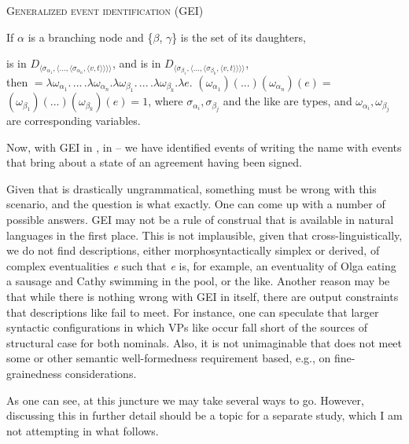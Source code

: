 \documentclass[output=paper,colorlinks,citecolor=brown]{langscibook}
\begin{document}
\ea   \textsc{Generalized event identification} (GEI)\label{ex:tatevosov:94}

If $\alpha$ is a branching node and \{$\beta$, $\gamma$\} is the set of its daughters,

\sib{$\beta$} is in $D_{\langle\sigma_{\alpha_{1}}, \langle..., \langle \sigma_{\alpha_{n}}, \langle v,t\rangle\rangle\rangle\rangle}$, and \sib{$\gamma$} is in $D_{\langle\sigma_{\beta_{1}}, \langle ..., \langle \sigma_{\beta_{k}}, \langle v,t\rangle\rangle\rangle\rangle}$, \\
then \sib{$\alpha$} $= \lambda \omega_{\alpha_{1}}.\, ...\, . \lambda \omega_{\alpha_{n}}. \lambda \omega_{\beta_{1}}.\, ...\, . \lambda \omega_{\beta_{k}}.\lambda e$. \sib{$\alpha$}$(\omega_{\alpha_{1}})(...)(\omega_{\alpha_{n}})(e) =$ \\\sib{$\beta$}$(\omega_{\beta_{1}})(...)(\omega_{\beta_{k}})(e) = 1$, where $\sigma_{\alpha_{i}}, \sigma_{\beta_{j}}$ and the like are types, and $\omega_{\alpha_{i}}, \omega_{\beta_{j}}$ are corresponding variables.  
\z

\noindent Now, with GEI in , in -- we have identified events of writing the name with events that bring about a state of an agreement having been signed.

Given that  is drastically ungrammatical, something must be wrong with this scenario, and the question is what exactly. One can come up with a number of possible answers. GEI may not be a rule of construal that is available in natural languages in the first place. This is not implausible, given that cross-linguistically, we do not find descriptions, either morphosyntactically simplex or derived, of complex eventualities \textit{e} such that \textit{e} is, for example, an eventuality of Olga eating a sausage and Cathy swimming in the pool, or the like. Another reason may be that while there is nothing wrong with GEI in itself, there are output constraints that descriptions like  fail to meet. For instance, one can speculate that larger syntactic configurations in which VPs like  occur fall short of the sources of structural case for both nominals. Also, it is not unimaginable that  does not meet some or other semantic well-formedness requirement based, e.g., on fine-grainedness considerations.

As one can see, at this juncture we may take several ways to go. However, discussing this in further detail should be a topic for a separate study, which I am not attempting in what follows. 
\end{document}
